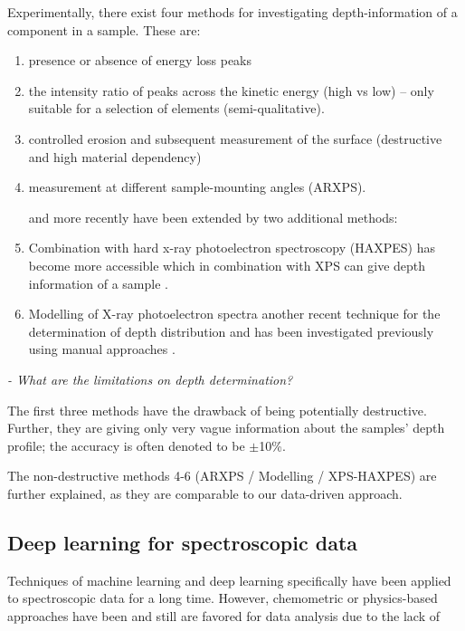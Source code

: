 Experimentally, there exist four methods for investigating depth-information of a component in a sample. These are:
\begin{enumerate}
    \item presence or absence of energy loss peaks
    \item the intensity ratio of peaks across the kinetic energy (high vs low) – only suitable for a selection of elements (semi-qualitative).
    \item controlled erosion and subsequent measurement of the surface (destructive and high material dependency)
    \item measurement at different sample-mounting angles (ARXPS). \cite{moulder_handbook_1992} 

and more recently have been extended by two additional methods:

    \item Combination with hard x-ray photoelectron spectroscopy (HAXPES) has become more accessible which in combination with XPS can give depth information of a sample \cite{zborowski_improved_2022}.
    \item Modelling of X-ray photoelectron spectra another recent technique for the determination of depth distribution and has been investigated previously using manual approaches \cite{zborowski_comparison_2022}.

\end{enumerate}



\textit{-	What are the limitations on depth determination?}

The  first three methods have the drawback of being potentially destructive. Further, they are giving only very vague information about the samples’ depth profile; the accuracy is often denoted to be $\pm$10\%.

The non-destructive methods 4-6 (ARXPS / Modelling / XPS-HAXPES) are further explained, as they are comparable to our data-driven approach. 

\subsection{Deep learning for spectroscopic data}
Techniques of machine learning and deep learning specifically have been applied to spectroscopic data for a long time. However, chemometric or physics-based approaches have been and still are favored for data analysis due to the lack of 



